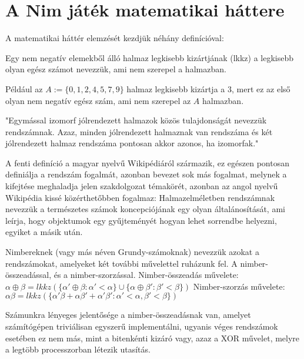 \section{A Nim játék matematikai háttere}
A matematikai háttér elemzését kezdjük néhány definícióval:

\begin{definition}
	Egy nem negatív elemekből álló halmaz legkisebb kizártjának (lkkz) a legkisebb olyan egész számot nevezzük, ami nem szerepel a halmazban.
\end{definition}

\begin{example}
	Például az $A:=\{0, 1, 2, 4, 5, 7, 9\}$ halmaz legkisebb kizártja a 3, mert ez az első olyan nem negatív egész szám, ami nem szerepel az $A$ halmazban.
\end{example}

\begin{definition}
	"Egymással izomorf jólrendezett halmazok közös tulajdonságát nevezzük rendszámnak. Azaz, minden jólrendezett halmaznak van rendszáma és két jólrendezett halmaz rendszáma pontosan akkor azonos, ha izomorfak."
\end{definition}

\begin{remark}
	A fenti definíció a magyar nyelvű Wikipédiáról származik, ez egészen pontosan definiálja a rendszám fogalmát, azonban bevezet sok más fogalmat, melynek a kifejtése meghaladja jelen szakdolgozat témakörét, azonban az angol nyelvű Wikipédia kissé közérthetőbben fogalmaz:
	Halmazelméletben rendszámnak nevezzük a természetes számok koncepciójának egy olyan általánosítását, ami leírja, hogy objektumok egy gyűjteményét hogyan lehet sorrendbe helyezni, egyiket a másik után.
\end{remark}

\begin{definition}
	Nimbereknek (vagy más néven Grundy-számoknak) nevezzük azokat a rendszámokat, amelyeket két további művelettel ruházunk fel. A nimber-összeadással, és a nimber-szorzással.\ujsor
	Nimber-összeadás művelete: $\alpha \oplus \beta = lkkz(\{\alpha' \oplus \beta: \alpha' < \alpha\} \cup \{\alpha \oplus \beta': \beta' < \beta \})$\ujsor
	Nimber-szorzás művelete: $\alpha \beta = lkkz(\{\alpha' \beta + \alpha \beta' + \alpha' \beta': \alpha' < \alpha, \beta' <  \beta\})$
\end{definition}

\begin{remark}
	Számunkra lényeges jelentősége a nimber-összeadásnak van, amelyet számítógépen triviálisan egyszerű implementálni, ugyanis véges rendszámok esetében ez nem más, mint a bitenkénti kizáró vagy, azaz a XOR művelet, melyre a legtöbb processzorban létezik utasítás. 
\end{remark}

